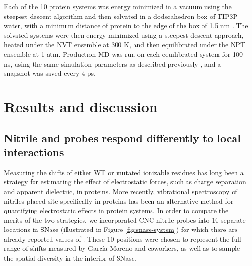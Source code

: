 Each of the 10 protein systems was energy minimized in a vacuum using the steepest descent algorithm and then solvated in a dodecahedron box of TIP3P water, with a minimum distance of protein to the edge of the box of 1.5 nm \cite{Jorgensen1983}. 
The solvated systems were then energy minimized using a steepest descent approach, heated under the NVT ensemble at 300 K, and then equilibrated under the NPT ensemble at 1 atm. 
Production MD was run on each equilibrated system for 100 ns, using the same simulation parameters as described previously \cite{First2018}, and a snapshot was saved every 4 ps.


\section{Results and discussion} \label{snase-results}

\subsection{Nitrile and \pKa{} probes respond differently to local interactions}

Measuring the \pKa{} shifts of either WT or mutated ionizable residues has long been a strategy for estimating the effect of electrostatic forces, such as charge separation and apparent dielectric, in proteins. 
More recently, vibrational spectroscopy of nitriles placed site-specifically in proteins has been an alternative method for quantifying electrostatic effects in protein systems. 
In order to compare the merits of the two strategies, we incorporated CNC nitrile probes into 10 separate locations in SNase (illustrated in Figure \ref{fig:snase-system}) for which there are already reported values of \dpKa{} \cite{Isom2010, Isom2011}. 
These 10 positions were chosen to represent the full range of \pKa{} shifts measured by Garc\'ia-Moreno and coworkers, as well as to sample the spatial diversity in the interior of SNase.


